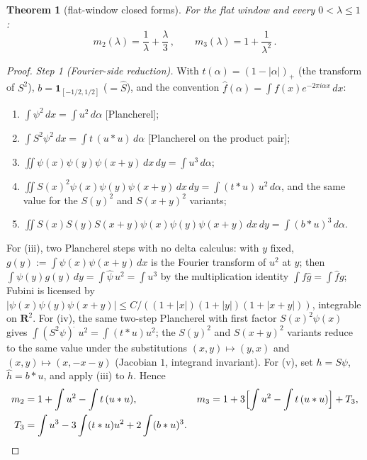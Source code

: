 \documentclass[11pt]{article}
\theoremstyle{plain}
\newtheorem{theorem}{Theorem}[section]
\theoremstyle{definition}
\theoremstyle{remark}
\newcommand{\R}{\mathbf{R}}
\newcommand{\one}{\mathbf{1}}
\begin{document}
\begin{theorem}[flat-window closed forms]
\label{thm:closedforms}
For the flat window and every $0 < \lambda \le 1$:
\[
  m_2(\lambda) = \frac{1}{\lambda} + \frac{\lambda}{3} \,,
  \qquad
  m_3(\lambda) = 1 + \frac{1}{\lambda^2} \,.
\]
\end{theorem}

\begin{proof}
\emph{Step 1 (Fourier-side reduction).} With $t(\alpha) = (1 - |\alpha|)_+$ (the
transform of $S^2$), $b = \one_{[-1/2, 1/2]}$ ($= \widehat{S}$), and the
convention $\widehat{f}(\alpha) = \int f(x) e^{-2\pi i \alpha x}\, dx$:
\begin{enumerate}
\item[(i)] $\int \psi^2\, dx = \int u^2\, d\alpha$ \hfill [Plancherel];
\item[(ii)] $\int S^2 \psi^2\, dx = \int t\, (u * u)\, d\alpha$
  \hfill [Plancherel on the product pair];
\item[(iii)] $\iint \psi(x) \psi(y) \psi(x + y)\, dx\, dy = \int u^3\, d\alpha$;
\item[(iv)] $\iint S(x)^2 \psi(x) \psi(y) \psi(x + y)\, dx\, dy
  = \int (t * u)\, u^2\, d\alpha$, and the same value for the $S(y)^2$ and
  $S(x+y)^2$ variants;
\item[(v)] $\iint S(x) S(y) S(x + y) \psi(x) \psi(y) \psi(x + y)\, dx\, dy
  = \int (b * u)^3\, d\alpha$.
\end{enumerate}
For (iii), two Plancherel steps with no delta calculus: with $y$ fixed,
$g(y) := \int \psi(x) \psi(x + y)\, dx$ is the Fourier transform of $u^2$ at $y$;
then $\int \psi(y) g(y)\, dy = \int \widehat{\psi}\, u^2 = \int u^3$ by the
multiplication identity $\int f \widehat{g} = \int \widehat{f} g$; Fubini is
licensed by
$|\psi(x)\psi(y)\psi(x+y)| \le C/((1+|x|)(1+|y|)(1+|x+y|))$, integrable on
$\R^2$. For (iv), the same two-step Plancherel with first factor
$S(x)^2 \psi(x)$ gives $\int (S^2\psi)^{\widehat{\ }}\, u^2 = \int (t * u) u^2$;
the $S(y)^2$ and $S(x+y)^2$ variants reduce to the same value under the
substitutions $(x, y) \mapsto (y, x)$ and $(x, y) \mapsto (x, -x-y)$ (Jacobian
$1$, integrand invariant). For (v), set $h = S\psi$, $\widehat{h} = b * u$, and
apply (iii) to $h$. Hence
\begin{align*}
  m_2 &= 1 + \int u^2 - \int t\,(u * u), &
  m_3 &= 1 + 3\Bigl[ \int u^2 - \int t\,(u * u) \Bigr] + T_3,\\
  T_3 &= \int u^3 - 3 \int (t * u) u^2 + 2 \int (b * u)^3. &&
\end{align*}


\end{proof}
\end{document}

